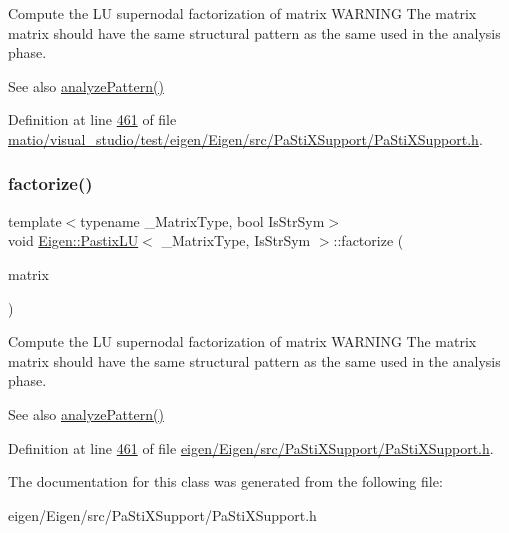 Compute the LU supernodal factorization of {\ttfamily matrix} W\+A\+R\+N\+I\+NG The matrix {\ttfamily matrix} should have the same structural pattern as the same used in the analysis phase. \begin{DoxySeeAlso}{See also}
\hyperlink{class_eigen_1_1_pastix_l_u_abae3ca7f1254106d9e2d5e0f273189fa}{analyze\+Pattern()} 
\end{DoxySeeAlso}


Definition at line \hyperlink{matio_2visual__studio_2test_2eigen_2_eigen_2src_2_pa_sti_x_support_2_pa_sti_x_support_8h_source_l00461}{461} of file \hyperlink{matio_2visual__studio_2test_2eigen_2_eigen_2src_2_pa_sti_x_support_2_pa_sti_x_support_8h_source}{matio/visual\+\_\+studio/test/eigen/\+Eigen/src/\+Pa\+Sti\+X\+Support/\+Pa\+Sti\+X\+Support.\+h}.

\mbox{\label{class_eigen_1_1_pastix_l_u_ac178a87b499a2210a402787fbfd98f26}} 
\subsubsection{\texorpdfstring{factorize()}{factorize()}\hspace{0.1cm}{\footnotesize\ttfamily [2/2]}}
{\footnotesize\ttfamily template$<$typename \+\_\+\+Matrix\+Type, bool Is\+Str\+Sym$>$ \\
void \hyperlink{class_eigen_1_1_pastix_l_u}{Eigen\+::\+Pastix\+LU}$<$ \+\_\+\+Matrix\+Type, Is\+Str\+Sym $>$\+::factorize (\begin{DoxyParamCaption}\item[{const Matrix\+Type \&}]{matrix }\end{DoxyParamCaption})\hspace{0.3cm}{\ttfamily [inline]}}

Compute the LU supernodal factorization of {\ttfamily matrix} W\+A\+R\+N\+I\+NG The matrix {\ttfamily matrix} should have the same structural pattern as the same used in the analysis phase. \begin{DoxySeeAlso}{See also}
\hyperlink{class_eigen_1_1_pastix_l_u_abae3ca7f1254106d9e2d5e0f273189fa}{analyze\+Pattern()} 
\end{DoxySeeAlso}


Definition at line \hyperlink{eigen_2_eigen_2src_2_pa_sti_x_support_2_pa_sti_x_support_8h_source_l00461}{461} of file \hyperlink{eigen_2_eigen_2src_2_pa_sti_x_support_2_pa_sti_x_support_8h_source}{eigen/\+Eigen/src/\+Pa\+Sti\+X\+Support/\+Pa\+Sti\+X\+Support.\+h}.



The documentation for this class was generated from the following file\+:\begin{DoxyCompactItemize}
\item 
eigen/\+Eigen/src/\+Pa\+Sti\+X\+Support/\+Pa\+Sti\+X\+Support.\+h\end{DoxyCompactItemize}
